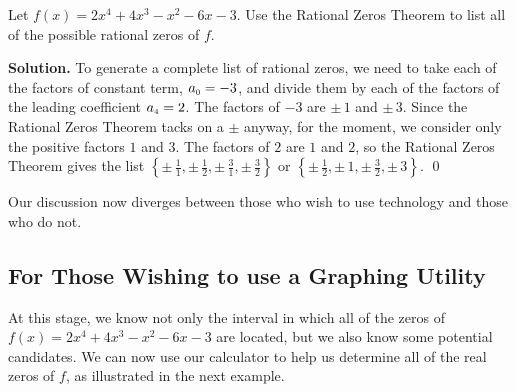 \documentclass{ximera}
\begin{document}
\begin{example}  Let $f(x) = 2x^4+4x^3-x^2-6x-3$. Use the Rational Zeros Theorem to list all of the possible rational zeros of $f$.

\smallskip

{\bf Solution.}  To generate a complete list of rational zeros, we need to take each of the factors of constant term, $a_{\mbox{\tiny$0$}} = -3$, and divide them by each of the factors of the leading coefficient $a_{\mbox{\tiny$4$}} = 2$.  The factors of $-3$ are $\pm \, 1$ and $\pm \, 3$.  Since the Rational Zeros Theorem tacks on a $\pm$ anyway, for the moment, we consider only the positive factors $1$ and $3$.  The factors of $2$ are  $1$ and $2$, so the Rational Zeros Theorem gives the list $\left\{\pm \, \frac{1}{1}, \pm \, \frac{1}{2},  \pm \, \frac{3}{1}, \pm \, \frac{3}{2}\right\}$ or $\left\{\pm \, \frac{1}{2}, \pm \, 1, \pm \, \frac{3}{2}, \pm \, 3\right\}$. \qed
\label{RZTex}
\end{example}

Our discussion now diverges between those who wish to use technology and those who do not.  

\subsection{For Those Wishing to use a Graphing Utility}

At this stage, we know not only the interval in which all of the zeros of $f(x) = 2x^4+4x^3-x^2-6x-3$ are located, but we also know some potential candidates.  We can now use our calculator to help us determine all of the real zeros of $f$, as illustrated in the next example.
\end{document}
